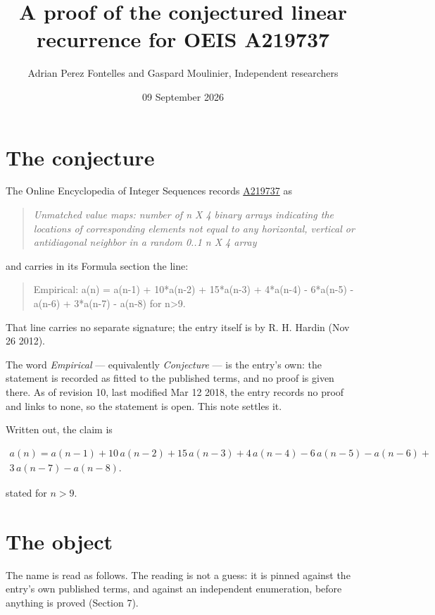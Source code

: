 \documentclass[11pt]{article}
\title{A proof of the conjectured linear recurrence for OEIS A219737}
\author{Adrian Perez Fontelles and Gaspard Moulinier, Independent researchers}
\date{09 September 2026}
\theoremstyle{definition}
\begin{document}
\maketitle
\section{The conjecture}

The Online Encyclopedia of Integer Sequences records \href{https://oeis.org/A219737}{A219737} as

\begin{quote}\itshape Unmatched value maps: number of n X 4 binary arrays indicating the locations of corresponding elements not equal to any horizontal, vertical or antidiagonal neighbor in a random 0..1 n X 4 array\end{quote}

and carries in its Formula section the line:

\begin{quote}\ttfamily Empirical: a(n) = a(n-1) + 10*a(n-2) + 15*a(n-3) + 4*a(n-4) - 6*a(n-5) - a(n-6) + 3*a(n-7) - a(n-8) for n>9.\end{quote}

That line carries no separate signature; the entry itself is by R. H. Hardin (Nov 26 2012).

The word {\itshape Empirical} --- equivalently {\itshape Conjecture} --- is the entry's own: the statement is recorded as fitted to the published terms, and no proof is given there. As of revision 10, last modified Mar 12 2018, the entry records no proof and links to none, so the statement is open. This note settles it.

Written out, the claim is

\begin{multline*} a(n) = a(n-1) + 10\,a(n-2) + 15\,a(n-3) + 4\,a(n-4) - 6\,a(n-5) - a(n-6) + \\ 3\,a(n-7) - a(n-8). \end{multline*}

stated for $n > 9$.

\section{The object}

The name is read as follows. The reading is not a guess: it is pinned against the entry's own published terms, and against an independent enumeration, before anything is proved (Section 7).
\end{document}
